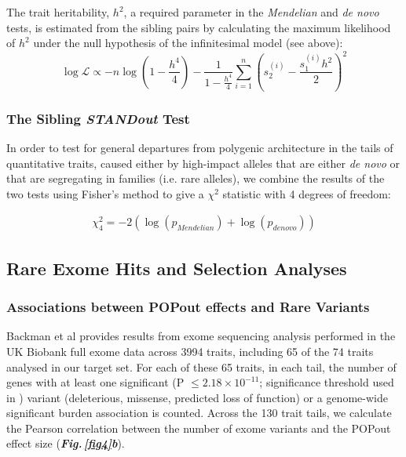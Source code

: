 \documentclass[12pt]{zHenriquesLab-StyleBioRxiv}
\newcommand\dref[2]{\normalsize{\textbf{\textit{Fig.\,\ref{#1}#2}}}\normalsize{}}
\begin{document}
{{The trait heritability, $h^2$, a required parameter in the {\em Mendelian} and {\em de novo} tests, 
is estimated from the sibling pairs by calculating the maximum likelihood of $h^2$ 
under the null hypothesis of the infinitesimal model (see above): 
\begin{equation*} \log \mathcal{L} \propto -n\log\left(1 -
    \frac{h^4}{4}\right) - \frac{1}{1-\frac{h^4}{4}} \sum_{i=1}^n
  \left( s_{2}^{(i)} - \frac{s_1^{(i)} h^2}{2}
  \right)^2
\end{equation*}

\subsubsection*{The Sibling \textit{STANDout}  Test} 

In order to test for general departures from polygenic architecture in the tails of 
quantitative traits, caused either by high-impact alleles that are either \emph{de novo} or 
that are segregating in families (i.e. rare alleles), we combine the results of the two tests 
using Fisher's method to give a $\chi^2$ statistic with 4 degrees of freedom: 

\begin{align*}
    \chi^2_4 = -2(\log(p_{Mendelian}) + \log(p_{de novo}))
\end{align*}

\subsection*{Rare Exome Hits and Selection Analyses} \label{sec:methods:rvs} 

\subsubsection*{Associations between POPout effects and Rare Variants}
Backman et al \cite{Backman2021} provides results from exome sequencing analysis 
performed in the UK Biobank full exome data across 3994 traits, including 65 of 
the 74 traits analysed in our target set. For each of these 65 traits, in each tail, 
the number of genes with at least one significant (P $\le 2.18\times 10^{-11}$; significance 
threshold used in \cite{Backman2021}) variant (deleterious, missense, predicted loss of function) or a 
genome-wide significant burden association is counted. Across the 130 trait tails, we 
calculate the Pearson correlation between the number of exome variants and the POPout 
effect size (\dref{fig4}{b}). 
%
}}
\end{document}
